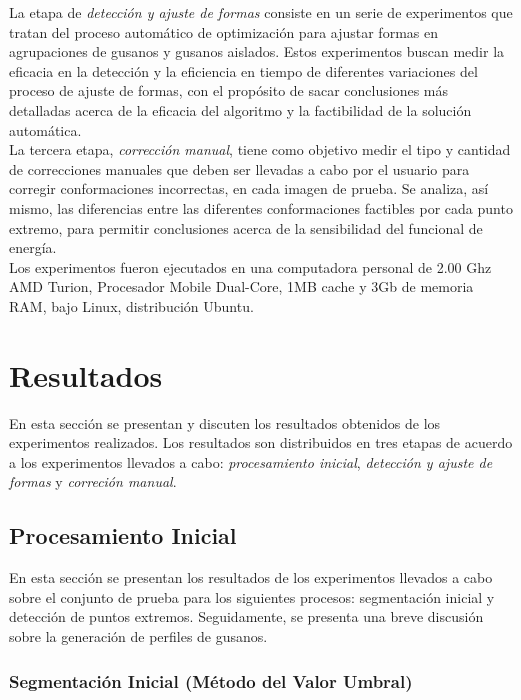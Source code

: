 La etapa de \emph{detecci\'on y ajuste de formas} consiste en un serie de experimentos que tratan
del proceso autom\'atico de optimizaci\'on para ajustar formas en agrupaciones de gusanos y 
gusanos aislados. Estos experimentos buscan medir la eficacia en la detecci\'on y la eficiencia
en tiempo de diferentes variaciones del proceso de ajuste de formas, con el prop\'osito de
sacar conclusiones m\'as detalladas acerca de la eficacia del algoritmo y la factibilidad de
la soluci\'on autom\'atica.\\

La tercera etapa, \emph{correcci\'on manual}, tiene como objetivo medir el tipo y cantidad
de correcciones manuales que deben ser llevadas a cabo por el usuario para corregir 
conformaciones incorrectas, en cada imagen de prueba. Se analiza,
 as\'i mismo, las diferencias entre las diferentes conformaciones factibles por cada
punto extremo, para permitir conclusiones acerca de la sensibilidad del funcional
de energ\'ia.\\

Los experimentos fueron ejecutados en una computadora personal de 2.00 Ghz AMD Turion,
Procesador Mobile Dual-Core, 1MB cache y 3Gb de memoria RAM, bajo Linux, distribuci\'on
Ubuntu.

\section{Resultados}
\label{sec:results}

En esta secci\'on se presentan y discuten los resultados obtenidos de los experimentos
realizados. Los resultados son distribuidos en tres etapas de acuerdo a los experimentos 
llevados a cabo: \emph{procesamiento inicial}, \emph{detecci\'on y ajuste de formas} y 
\emph{correci\'on manual}.

\subsection{Procesamiento Inicial}
\label{sec:initproc}

En esta secci\'on se presentan los resultados de los experimentos llevados a cabo sobre
el conjunto de prueba para los siguientes procesos: segmentaci\'on inicial y detecci\'on
de puntos extremos. Seguidamente, se presenta una breve discusi\'on sobre la generaci\'on
de perfiles de gusanos.

\subsubsection*{Segmentaci\'on Inicial (M\'etodo del Valor Umbral)}

